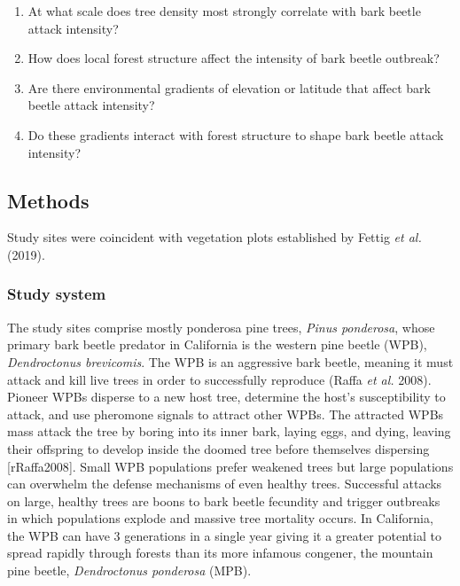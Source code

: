 \documentclass[]{article}
\begin{document}
\begin{enumerate}
\def\labelenumi{\arabic{enumi}.}
\item
  At what scale does tree density most strongly correlate with bark
  beetle attack intensity?
\item
  How does local forest structure affect the intensity of bark beetle
  outbreak?
\item
  Are there environmental gradients of elevation or latitude that affect
  bark beetle attack intensity?
\item
  Do these gradients interact with forest structure to shape bark beetle
  attack intensity?
\end{enumerate}

\subsection{Methods}\label{methods}

Study sites were coincident with vegetation plots established by Fettig
\emph{et al.} (2019).

\subsubsection{Study system}\label{study-system}

The study sites comprise mostly ponderosa pine trees, \emph{Pinus
ponderosa}, whose primary bark beetle predator in California is the
western pine beetle (WPB), \emph{Dendroctonus brevicomis}. The WPB is an
aggressive bark beetle, meaning it must attack and kill live trees in
order to successfully reproduce (Raffa \emph{et al.} 2008). Pioneer WPBs
disperse to a new host tree, determine the host's susceptibility to
attack, and use pheromone signals to attract other WPBs. The attracted
WPBs mass attack the tree by boring into its inner bark, laying eggs,
and dying, leaving their offspring to develop inside the doomed tree
before themselves dispersing {[}rRaffa2008{]}. Small WPB populations
prefer weakened trees but large populations can overwhelm the defense
mechanisms of even healthy trees. Successful attacks on large, healthy
trees are boons to bark beetle fecundity and trigger outbreaks in which
populations explode and massive tree mortality occurs. In California,
the WPB can have 3 generations in a single year giving it a greater
potential to spread rapidly through forests than its more infamous
congener, the mountain pine beetle, \emph{Dendroctonus ponderosa} (MPB).
\end{document}
